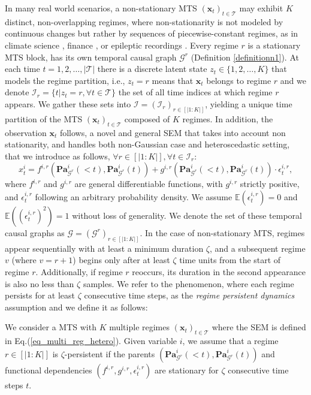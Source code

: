 In many real world scenarios, a non-stationary MTS $(\boldsymbol{x}_t)_{t \in \mathcal{T}}$ may exhibit $K$ distinct, non-overlapping regimes, where non-stationarity is not modeled by continuous changes but rather by sequences of piecewise-constant regimes, as in climate science \citep{karmouche2023regime}, finance \citep{hamilton1994autoregressive}, or epileptic recordings \citep{wang2024ictal}.  Every regime $r$ is a stationary MTS block, has its own temporal causal graph $\mathcal{G}^r$ (Definition \ref{definitionn1}). At each time $t=1,2, \ldots, |\mathcal{T}|$ there is a discrete latent state $z_t \in\{1,2, \ldots, K\}$ that models the regime partition, i.e., $z_t = r$ means that $\boldsymbol{x}_t$ belongs to regime $r$ and we denote $\mathcal{I}_r = \{t| z_t = r, \forall t\in \mathcal{T}\}$ the set of all time indices at which regime $r$ appears. We gather these sets into $\mathcal{I} = (\mathcal{I}_r)_{r \in [|1:K|]}$, yielding a unique time partition of the MTS $(\boldsymbol{x}_t)_{t \in \mathcal{T}}$ composed of $K$ regimes. In addition, the observation $\boldsymbol{x}_t$ follows, a novel and general SEM that takes into account non stationarity, and handles both non-Gaussian case and heteroscedastic setting, that we introduce as follows, $\forall r \in [|1:K|], \forall t \in \mathcal{I}_r$:
\begin{equation}
  x_t^i= f^{i,r}\left(\mathbf{P a}_{\mathcal{G}^r}^i(<t), \mathbf{P a}_{\mathcal{G}^r}^i(t)\right)+g^{i,r}\left(\mathbf{P a}_{\mathcal{G}^r}^i(<t), \mathbf{P a}_{\mathcal{G}^r}^i(t)\right)\cdot\epsilon_t^{i,r},
\label{eq_multi_reg_hetero}
\end{equation}
where $f^{i,r}$ and $g^{i,r}$ are general differentiable functions, with $g^{i,r}$ strictly positive, and $\epsilon_t^{i,r}$ following an arbitrary probability density. We assume $\mathbb{E}(\epsilon_t^{i,r}) = 0$ and $\mathbb{E}((\epsilon_t^{i,r})^2) = 1$ without loss of generality. We denote the set of these temporal causal graphs as $\boldsymbol{\mathcal{G}} = (\mathcal{G}^r)_{r \in [|1:K|]}$. 
In the case of non-stationary MTS, regimes appear sequentially with at least a minimum duration $\zeta$, and a subsequent regime $v$ (where $v = r+1$) begins only after at least $\zeta$ time units from the start of regime $r$. Additionally, if regime $r$ reoccurs, its duration in the second appearance is also no less than $\zeta$ samples. We refer to the phenomenon, where each regime persists for at least $\zeta$ consecutive time steps, as the \emph{regime persistent dynamics} assumption and we define it as follows:
\begin{assumption}
    We consider a MTS with $K$ multiple regimes $(\boldsymbol{x}_t)_{t \in \mathcal{T}}$ where the SEM is defined in Eq.(\ref{eq_multi_reg_hetero}). Given variable $i$, we assume that a regime $r \in [|1:K|]$ is $\zeta$-persistent if the parents $(\mathbf{P a}_{\mathcal{G}^r}^i(<t), \mathbf{P a}_{\mathcal{G}^r}^i(t))$ and functional dependencies $(f^{i,r}, g^{i,r}, \epsilon_t^{i,r})$ are stationary for $\zeta$ consecutive time steps $t$.
    \label{persis_assump}
\end{assumption}
